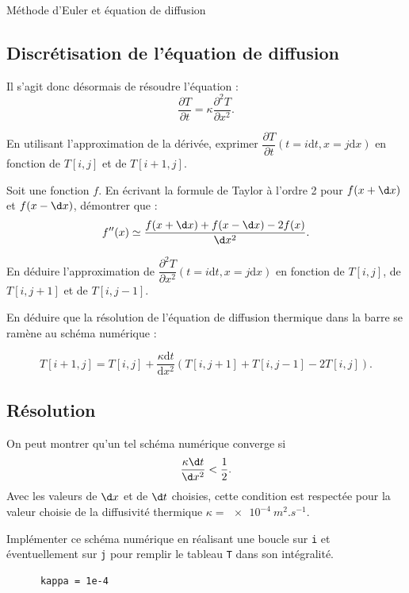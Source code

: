 \begin{exo}[PC][1][devoir]{Méthode d'Euler et équation de diffusion}
  \subsection{Discrétisation de l'équation de diffusion}
  Il s'agit donc désormais de résoudre l'équation :
  $$\frac{\partial T}{\partial t} = \kappa \frac{\partial^2 T}{\partial x^2}.$$
  \begin{quest}
    \item En utilisant l'approximation de la dérivée, exprimer $\dfrac{\partial T}{\partial t}(t=i\mathrm{d}t,x=j\mathrm{d}x)$ en fonction de $T[i,j]$ et de $T[i+1,j]$.
    \item Soit une fonction $f$. En écrivant la formule de Taylor à l’ordre 2 pour $f(x+\d x)$ et $f(x-\d x)$, démontrer que : 
    $$ f''(x)\simeq\frac{f(x+\d x)+f(x-\d x)-2f(x)}{\d x^2}.$$
    \item En déduire l'approximation de $\dfrac{\partial^2 T}{\partial x^2}(t=i\mathrm{d}t,x=j\mathrm{d}x)$ en fonction de $T[i,j]$, de $T[i,j+1]$ et de $T[i,j-1]$.
    \item En déduire que la résolution de l'équation de diffusion thermique dans la barre se ramène au schéma numérique :
    \begin{center}
      $$ T[i+1,j]=T[i,j]+\frac{\kappa \mathrm{d}t}{\mathrm{d}x^2} \left( T[i,j+1]+T[i,j-1]-2T[i,j]\right).$$
    \end{center}
  \end{quest}

  \subsection{Résolution}
  On peut montrer qu'un tel schéma numérique converge si $$\frac{\kappa \d t}{\d x^2}<\frac{1}{2}.$$ Avec les valeurs de $\d x$ et de $\d t$ choisies, cette condition est respectée pour la valeur choisie de la diffusivité thermique $\kappa=\SI{e-4}{m^2.s^{-1}}$.
  \begin{quest}
    \item	Implémenter ce schéma numérique en réalisant une boucle sur \texttt{i} et éventuellement sur \texttt{j} pour remplir le tableau \texttt{T} dans son intégralité.
      \begin{verbatim}
      kappa = 1e-4


\end{verbatim}
\end{quest}
\end{exo}
